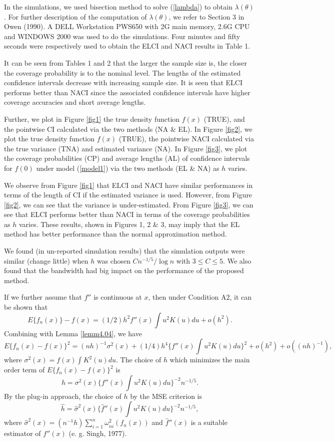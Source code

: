 \documentclass[12pt]{article}
\begin{document}
In the simulations, we used bisection method to solve (\ref{lambda}) to obtain $\lambda(\theta)$. For further description of the computation of $\lambda(\theta)$, we refer to Section 3 in Owen (1990). A DELL Workstation PWS650 with 2G main memory, 2.6G CPU and WINDOWS 2000 was used to do the simulations.
Four minutes and fifty seconds were respectively used to obtain  the ELCI and NACI results in Table 1.


It can be seen from
Tables 1 and 2 that
the larger the sample size is, the closer the coverage probability is to the nominal level. The lengths of the
estimated confidence intervals  decrease with increasing sample size. It is seen  that ELCI performs better than NACI
since the associated confidence intervals have higher coverage accuracies and short average lengths.

Further, we plot in Figure \ref{fig1} the true density function $f(x)$ (TRUE),
and the pointwise CI calculated via the two methods (NA \& EL). In Figure \ref{fig2}, we plot the true density function $f(x)$ (TRUE),
the pointwise NACI calculated via the true variance (TNA) and estimated variance (NA).
In Figure \ref{fig3}, we plot the coverage probabilities (CP) and average lengths (AL) of confidence intervals for  $f(0)$ under model (\ref{model1}) via the two methods (EL \& NA) as $h$ varies.

We observe from Figure \ref{fig1} that
ELCI and NACI have similar performances in terms of the length of CI if the estimated variance is used. However, from Figure \ref{fig2}, we can see that the variance is under-estimated. From Figure \ref{fig3}, we can see that ELCI performs better than NACI
in terms of the coverage probabilities as $h$ varies.   These results, shown in Figures 1, 2  \& 3, may imply that the EL method has better performance than the normal approximation method.

We found (in un-reported simulation results) that the simulation outputs were similar (change little) when $h$ was chosen $Cn^{-1/5}/\log n$ with $3\leq C \leq 5$. We also found that the bandwidth had big impact on the performance of the proposed method.

 If we further assume that $f''$ is continuous at $x$, then under Condition A2, it can be shown that
\[
E\{f_n(x)\}-f(x)=(1/2)h^2f''(x)\int u^2K(u)du+o(h^2).
\]
Combining with Lemma \ref{lemm4.04}, we have
\[
E\{f_n(x)-f(x)\}^2=(nh)^{-1}\sigma^2(x)+(1/4)h^4\{f''(x)\int u^2K(u)du\}^2+o(h^2)+o((nh)^{-1}),
\]
where $\sigma^2(x)=f(x)\int K^2(u)du$. The choice of $h$ which minimizes the main order term of $E\{f_n(x)-f(x)\}^2$ is
\[
h=\sigma^2(x)\{f''(x)\int u^2K(u)du\}^{-2}n^{-1/5}.
\]
By the plug-in approach, the choice of $h$ by the MSE criterion is
\[
\hat{h}=\hat{\sigma}^2(x)\{\hat{f}''(x)\int u^2K(u)du\}^{-2}n^{-1/5},
\]
where $\hat{\sigma}^2(x)=(n^{-1}h)\sum^{n}_{i=1}\omega^2_{ni}(f_n(x))$  and $\hat{f}''(x)$ is a suitable estimator of $f''(x)$ (e. g. Singh, 1977).
\end{document}
